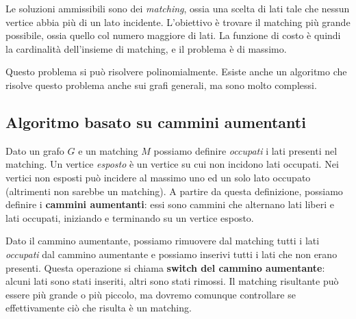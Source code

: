 Le soluzioni ammissibili sono dei \textit{matching}, ossia una scelta di lati
tale che nessun vertice abbia più di un lato incidente. L'obiettivo è trovare il
matching più grande possibile, ossia quello col numero maggiore di lati.
La funzione di costo è quindi la cardinalità dell'insieme di matching,
e il problema è di massimo.

Questo problema si può risolvere polinomialmente. Esiste anche un algoritmo
che risolve questo problema anche sui grafi generali, ma sono molto complessi.

\subsection{Algoritmo basato su cammini aumentanti}
Dato un grafo $G$ e un matching $M$ possiamo definire \textit{occupati}
i lati presenti nel matching. Un vertice \textit{esposto} è un vertice su
cui non incidono lati occupati. Nei vertici non esposti può incidere al massimo
uno ed un solo lato occupato (altrimenti non sarebbe un matching). A partire
da questa definizione, possiamo definire i \textbf{cammini aumentanti}:
essi sono cammini che alternano lati liberi e lati occupati, iniziando e
terminando su un vertice esposto.

Dato il cammino aumentante, possiamo rimuovere dal matching tutti i lati
\textit{occupati} dal cammino aumentante e possiamo inserivi tutti i lati che non
erano presenti. Questa operazione si chiama \textbf{switch del cammino aumentante}:
alcuni lati sono stati inseriti, altri sono stati rimossi. Il matching risultante
può essere più grande o più piccolo, ma dovremo comunque controllare se effettivamente
ciò che risulta è un matching.


